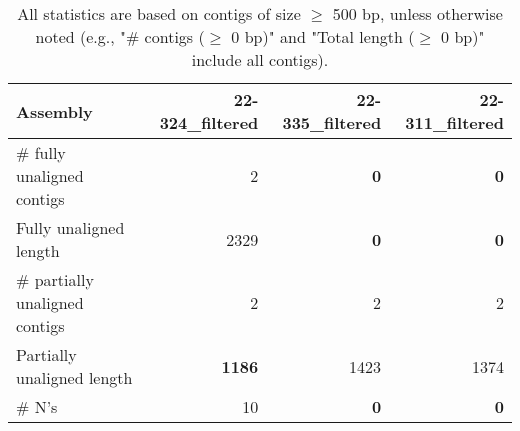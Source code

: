 \documentclass[12pt,a4paper]{article}
\begin{document}
\begin{table}[ht]
\begin{center}
\caption{All statistics are based on contigs of size $\geq$ 500 bp, unless otherwise noted (e.g., "\# contigs ($\geq$ 0 bp)" and "Total length ($\geq$ 0 bp)" include all contigs).}
\begin{tabular}{|l*{3}{|r}|}
\hline
Assembly & 22-324\_filtered & 22-335\_filtered & 22-311\_filtered \\ \hline
\# fully unaligned contigs & 2 & {\bf 0} & {\bf 0} \\ \hline
Fully unaligned length & 2329 & {\bf 0} & {\bf 0} \\ \hline
\# partially unaligned contigs & 2 & 2 & 2 \\ \hline
Partially unaligned length & {\bf 1186} & 1423 & 1374 \\ \hline
\# N's & 10 & {\bf 0} & {\bf 0} \\ \hline
\end{tabular}
\end{center}
\end{table}
\end{document}
